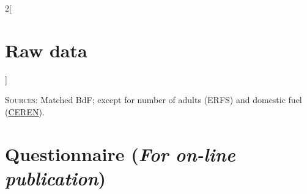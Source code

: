 \documentclass[12pt]{article} %
\renewcommand{\arraystretch}{0.73}
\begin{document}
\begin{appendices}
\begin{multicols}{2}[\section{Raw data\label{sec:Raw-Data}}]
\begin{table}[H]
     \footnotesize{\textsc{Sources:} Matched BdF; except for number of adults (ERFS) and domestic fuel (\href{https://www.lesechos.fr/industrie-services/energie-environnement/le-chauffage-au-fioul-devient-de-plus-en-plus-cher-147372}{CEREN}).} %
\end{table}

\end{multicols}
\restoregeometry

\renewcommand{\arraystretch}{0.73}

\section{Questionnaire (\emph{For on-line publication})} \label{sec:questionnaire} 


\end{appendices}
\end{document}
